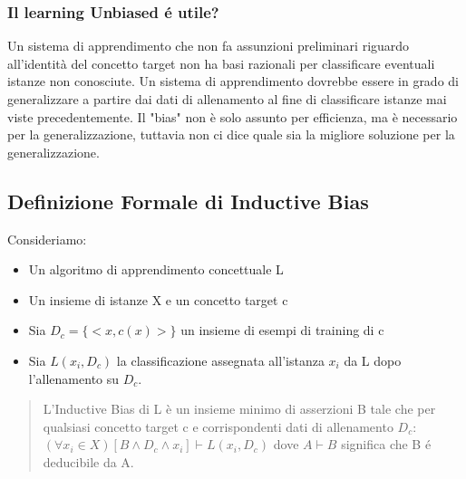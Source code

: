 \documentclass{article}
\begin{document}
\subsubsection{Il learning Unbiased é utile?}
Un sistema di apprendimento che non fa assunzioni preliminari riguardo all'identità del concetto target non ha basi razionali per classificare eventuali istanze non conosciute. Un sistema di apprendimento dovrebbe essere in grado di generalizzare a partire dai dati di allenamento al fine di classificare istanze mai viste precedentemente. Il "bias" non è solo assunto per efficienza, ma è necessario per la generalizzazione, tuttavia non ci dice quale sia la migliore soluzione per la generalizzazione.

\subsection{Definizione Formale di Inductive Bias}
Consideriamo:
\begin{itemize}
    \item Un algoritmo di apprendimento concettuale L
    \item Un insieme di istanze X e un concetto target c
    \item Sia $D_c = \{<x, c(x)>\}$ un insieme di esempi di training di c
    \item Sia $L(x_i, D_c)$ la classificazione assegnata all'istanza $x_i$ da L dopo l'allenamento su $D_c$.
\end{itemize}
\begin{quote}
    L'Inductive Bias di L è un insieme minimo di asserzioni B tale che per qualsiasi concetto target c e corrispondenti dati di allenamento $D_c$: \newline
    $(\forall x_i \in X)[B \land D_c \land x_i] \vdash L(x_i,D_c)$ dove $A \vdash B$ significa che B é deducibile da A.
\end{quote}
\end{document}
